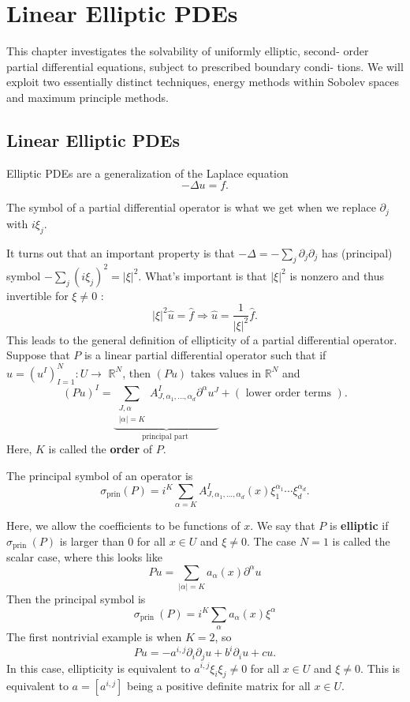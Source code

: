 \newpage 
\chapter{Linear Elliptic PDEs}
This chapter investigates the solvability of uniformly elliptic, second- order partial diﬀerential equations, subject to prescribed boundary condi- 
tions. We will exploit two essentially distinct techniques, energy methods 
within Sobolev spaces and maximum principle methods.

\section{Linear Elliptic PDEs}
Elliptic PDEs are a generalization of the Laplace equation 
\[
    -\Delta u = f. 
\]

\begin{definition}
[Symbol]
\label{def: Symbol}
The symbol of a partial differential operator is what we get when we replace $\partial_{j}$ with $i \xi_{j}$.
\end{definition}

It turns out that an important property is that $-\Delta = -\sum_{j} \partial_{j} \partial_{j}$ has (principal) symbol $-\sum_{j}\left(i \xi_{j}\right)^{2}=|\xi|^{2}$. What's important is that $|\xi|^{2}$ is nonzero and thus invertible for $\xi \neq 0$ :
$$
|\xi|^{2} \widehat{u}=\widehat{f} \Longrightarrow \widehat{u}=\frac{1}{|\xi|^{2}} \widehat{f} .
$$
This leads to the general definition of ellipticity of a partial differential operator.
Suppose that $P$ is a linear partial differential operator such that if $u=\left(u^{I}\right)_{I=1}^{N}: U \rightarrow$ $\mathbb{R}^{N}$, then $(P u)$ takes values in $\mathbb{R}^{N}$ and
$$
(P u)^{I}=\underbrace{\sum_{\substack{J, \alpha \\|\alpha|=K}} A_{J, \alpha_{1}, \ldots, \alpha_{d}}^{I} \partial^{\alpha} u^{J}}_{\text {principal part }}+(\text { lower order terms }) .
$$
Here, $K$ is called the \textbf{order} of $P$.

\begin{definition}
\label{def: Principal symbol}
The principal symbol of an operator is
$$
\sigma_{\operatorname{prin}}(P)=i^{K} \sum_{\alpha=K} A_{J, \alpha_{1}, \ldots, \alpha_{d}}^{I}(x) \xi_{1}^{\alpha_{1}} \cdots \xi_{d}^{\alpha_{d}} .
$$
\end{definition}

Here, we allow the coefficients to be functions of $x$. We say that $P$ is \textbf{elliptic} if $\sigma_{\text {prin }}(P)$ is larger than $0$ for all $x \in U$ and $\xi \neq 0$.
The case $N=1$ is called the scalar case, where this looks like
$$
P u=\sum_{|\alpha|=K} a_{\alpha}(x) \partial^{\alpha} u
$$
Then the principal symbol is
$$
\sigma_{\text {prin }}(P)=i^{K} \sum_{\alpha} a_{\alpha}(x) \xi^{\alpha}
$$
The first nontrivial example is when $K=2$, so
$$
P u= - a^{i, j} \partial_{i} \partial_{j} u +b^{i} \partial_{i}u+c u.
$$
In this case, ellipticity is equivalent to $a^{i, j} \xi_{i} \xi_{j} \neq 0$ for all $x \in U$ and $\xi \neq 0$. This is equivalent to $a=\left[a^{i, j}\right]$ being a positive definite matrix for all $x \in U$.

